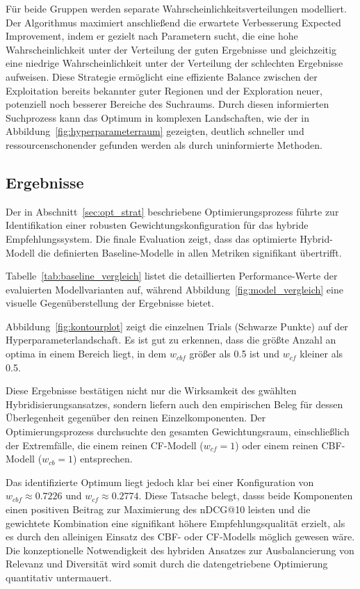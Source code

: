 Für beide Gruppen werden separate Wahrscheinlichkeitsverteilungen modelliert. Der Algorithmus maximiert 
anschließend die erwartete Verbesserung Expected Improvement, indem er gezielt nach Parametern sucht, 
die eine hohe Wahrscheinlichkeit unter der Verteilung der guten Ergebnisse und gleichzeitig eine 
niedrige Wahrscheinlichkeit unter der Verteilung der schlechten Ergebnisse aufweisen. Diese Strategie 
ermöglicht eine effiziente Balance zwischen der Exploitation bereits bekannter guter 
Regionen und der Exploration neuer, potenziell noch besserer Bereiche des Suchraums. 
Durch diesen informierten Suchprozess kann das Optimum in komplexen Landschaften, wie der in 
Abbildung~\ref{fig:hyperparameterraum} gezeigten, deutlich schneller und ressourcenschonender 
gefunden werden als durch uninformierte Methoden.

\subsection{Ergebnisse}
\label{sec:results}
Der in Abschnitt~\ref{sec:opt_strat} beschriebene Optimierungsprozess führte zur Identifikation 
einer robusten Gewichtungskonfiguration für das hybride Empfehlungssystem. Die finale 
Evaluation zeigt, dass das optimierte Hybrid-Modell die definierten Baseline-Modelle 
in allen Metriken signifikant übertrifft.

Tabelle~\ref{tab:baseline_vergleich} listet die detaillierten Performance-Werte der evaluierten 
Modellvarianten auf, während Abbildung~\ref{fig:model_vergleich} eine visuelle 
Gegenüberstellung der Ergebnisse bietet.





Abbildung~\ref{fig:kontourplot} zeigt die einzelnen Trials (Schwarze Punkte) auf der Hyperparameterlandschaft. 
Es ist gut zu erkennen, dass die größte Anzahl an optima in einem Bereich liegt, in dem $w_{cbf}$ größer als 0.5 ist und
$w_{cf}$ kleiner als 0.5.

Diese Ergebnisse bestätigen nicht nur die Wirksamkeit des gwählten
Hybridisierungsansatzes, sondern liefern auch den empirischen Beleg für dessen Überlegenheit gegenüber den reinen
Einzelkomponenten. Der Optimierungsprozess durchsuchte den gesamten Gewichtungsraum, einschließlich der Extremfälle,
die einem reinen \ac{CF}-Modell ($w_{cf} = 1$) oder einem reinen \ac{CBF}-Modell ($w_{cb} = 1$) entsprechen.

Das identifizierte Optimum liegt jedoch klar bei einer Konfiguration von \(w_{cbf} \approx 0.7226\) und
\(w_{cf} \approx 0.2774\). Diese Tatsache belegt, dasss beide Komponenten einen positiven Beitrag zur Maximierung
des \ac{nDCG}@10 leisten und die gewichtete Kombination eine signifikant höhere Empfehlungsqualität erzielt, als es durch den
alleinigen Einsatz des \ac{CBF}- oder \ac{CF}-Modells möglich gewesen wäre. Die konzeptionelle Notwendigkeit des hybriden
Ansatzes zur Ausbalancierung von Relevanz und Diversität wird somit durch die datengetriebene Optimierung quantitativ
untermauert.

